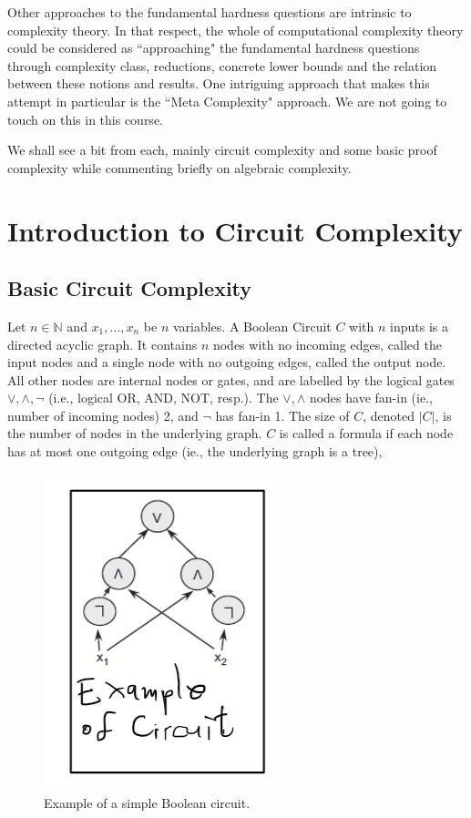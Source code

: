 Other approaches to the fundamental hardness questions are intrinsic to complexity theory. In that respect, the whole of computational complexity theory could be considered as ``approaching" the fundamental hardness questions through complexity class, reductions, concrete lower bounds and the relation between these notions and results. One intriguing approach that makes this attempt in particular is the ``Meta Complexity" approach. We are not going to touch on this in this course. 

We shall see a bit from each, mainly circuit complexity and some basic proof complexity while commenting briefly on algebraic complexity. 




\chapter{Introduction to Circuit Complexity}
\label{intro} %
 

\section{Basic Circuit Complexity}
\label{sec:2}

\begin{definition}
Let $n \in \mathbb{N}$ and $x_1, \ldots, x_n$ be $n$ variables. A Boolean Circuit $C$ with $n$ inputs is a directed acyclic graph. It contains $n$ nodes with no incoming edges, called the input nodes and a single node with no outgoing edges, called the output node.
All other nodes are internal nodes or gates, and
are labelled by the logical gates $\lor, \land,\neg$ (i.e., logical OR, AND, NOT, resp.). The $\lor,\land$ nodes have fan-in (ie., number of incoming nodes) 2, and $\neg$ has fan-in 1. The size of $C$, denoted $|C|$, is the number of nodes in the underlying graph.
$C$ is called a formula if each node has at most one outgoing edge (ie., the underlying graph is a tree),

\end{definition}




\begin{figure}
\sidecaption
    \includegraphics[width=0.2\linewidth]{images/Example-circuit.png}
    \caption{Example of a simple Boolean circuit.}
    \label{fig:enter-label}
\end{figure}


